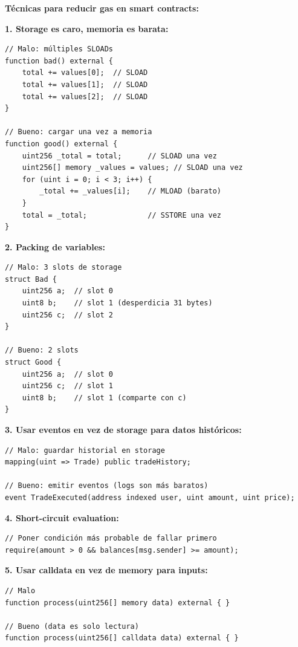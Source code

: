 \documentclass[11pt,a4paper,twoside,openright]{book}
\theoremstyle{definition}
\theoremstyle{plain}
\theoremstyle{remark}
\begin{document}
\begin{keyidea}
\textbf{Técnicas para reducir gas en smart contracts:}

\textbf{1. Storage es caro, memoria es barata:}
\begin{verbatim}
// Malo: múltiples SLOADs
function bad() external {
    total += values[0];  // SLOAD
    total += values[1];  // SLOAD
    total += values[2];  // SLOAD
}

// Bueno: cargar una vez a memoria
function good() external {
    uint256 _total = total;      // SLOAD una vez
    uint256[] memory _values = values; // SLOAD una vez
    for (uint i = 0; i < 3; i++) {
        _total += _values[i];    // MLOAD (barato)
    }
    total = _total;              // SSTORE una vez
}
\end{verbatim}

\textbf{2. Packing de variables:}
\begin{verbatim}
// Malo: 3 slots de storage
struct Bad {
    uint256 a;  // slot 0
    uint8 b;    // slot 1 (desperdicia 31 bytes)
    uint256 c;  // slot 2
}

// Bueno: 2 slots
struct Good {
    uint256 a;  // slot 0
    uint256 c;  // slot 1
    uint8 b;    // slot 1 (comparte con c)
}
\end{verbatim}

\textbf{3. Usar eventos en vez de storage para datos históricos:}
\begin{verbatim}
// Malo: guardar historial en storage
mapping(uint => Trade) public tradeHistory;

// Bueno: emitir eventos (logs son más baratos)
event TradeExecuted(address indexed user, uint amount, uint price);
\end{verbatim}

\textbf{4. Short-circuit evaluation:}
\begin{verbatim}
// Poner condición más probable de fallar primero
require(amount > 0 && balances[msg.sender] >= amount);
\end{verbatim}

\textbf{5. Usar calldata en vez de memory para inputs:}
\begin{verbatim}
// Malo
function process(uint256[] memory data) external { }

// Bueno (data es solo lectura)
function process(uint256[] calldata data) external { }
\end{verbatim}
\end{keyidea}
\end{document}
